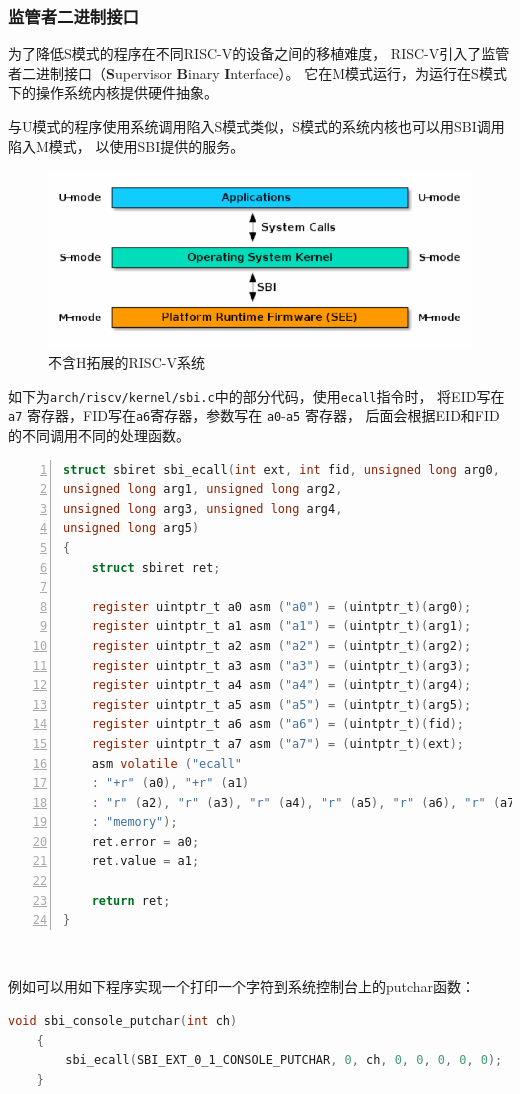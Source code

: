 \documentclass{../runikraft-report}
\begin{document}
\subsubsection{监管者二进制接口}
为了降低S模式的程序在不同RISC-V的设备之间的移植难度，
RISC-V引入了监管者二进制接口（\textbf{S}upervisor \textbf{B}inary \textbf{I}nterface）。
它在M模式运行，为运行在S模式下的操作系统内核提供硬件抽象。

与U模式的程序使用系统调用陷入S模式类似，S模式的系统内核也可以用SBI调用陷入M模式，
以使用SBI提供的服务。

\begin{figure}[tbh!]
\centering
\includegraphics[width=0.7\linewidth]{assets/RISCV-SBI}
\caption{不含H拓展的RISC-V系统}
\label{fig:riscv-sbi}
\end{figure}

如下为\texttt{arch/riscv/kernel/sbi.c}中的部分代码，使用\texttt{ecall}指令时，
将EID写在\texttt{a7} 寄存器，FID写在\texttt{a6}寄存器，参数写在 \texttt{a0}-\texttt{a5} 寄存器，
后面会根据EID和FID的不同调用不同的处理函数。
\begin{lstlisting}[language=C,numbers=left]
struct sbiret sbi_ecall(int ext, int fid, unsigned long arg0,
unsigned long arg1, unsigned long arg2,
unsigned long arg3, unsigned long arg4,
unsigned long arg5)
{
	struct sbiret ret;

	register uintptr_t a0 asm ("a0") = (uintptr_t)(arg0);
	register uintptr_t a1 asm ("a1") = (uintptr_t)(arg1);
	register uintptr_t a2 asm ("a2") = (uintptr_t)(arg2);
	register uintptr_t a3 asm ("a3") = (uintptr_t)(arg3);
	register uintptr_t a4 asm ("a4") = (uintptr_t)(arg4);
	register uintptr_t a5 asm ("a5") = (uintptr_t)(arg5);
	register uintptr_t a6 asm ("a6") = (uintptr_t)(fid);
	register uintptr_t a7 asm ("a7") = (uintptr_t)(ext);
	asm volatile ("ecall"
	: "+r" (a0), "+r" (a1)
	: "r" (a2), "r" (a3), "r" (a4), "r" (a5), "r" (a6), "r" (a7)
	: "memory");
	ret.error = a0;
	ret.value = a1;

	return ret;
}
\end{lstlisting}​

例如可以用如下程序实现一个打印一个字符到系统控制台上的putchar函数：
\begin{lstlisting}[language=C]
    void sbi_console_putchar(int ch)
    {
    	sbi_ecall(SBI_EXT_0_1_CONSOLE_PUTCHAR, 0, ch, 0, 0, 0, 0, 0);
    }
\end{lstlisting}
\end{document}
